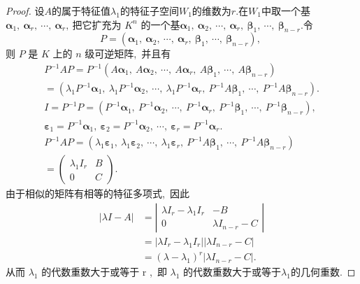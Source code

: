 \begin{proof}
	设$A$的属于特征值$\lambda_1$的特征子空间$W_1$的维数为$r.$在$W_1$中取一个基$\boldsymbol{\alpha}_1,\ \boldsymbol{\alpha}_r,\ \cdots,\  \boldsymbol{\alpha}_{r} ,\  $把它扩充为 $ K^{n} $ 的一个基$  \boldsymbol{\alpha}_{1},\  \boldsymbol{\alpha}_{2},\  \cdots,\  \boldsymbol{\alpha}_{r},\  \boldsymbol{\beta}_{1},\  \cdots,\  \boldsymbol{\beta}_{n-r} .$令
	$$P=\left(\boldsymbol{\alpha}_{1},\  \boldsymbol{\alpha}_{2},\  \cdots,\  \boldsymbol{\alpha}_{r},\  \boldsymbol{\beta}_{1},\  \cdots,\  \boldsymbol{\beta}_{n-r}\right),\ $$
	则 $ P$  是  $K$  上的  $n$  级可逆矩阵,\ 并且有
	$$\begin{array}{l} 
		P^{-1} A P= P^{-1}\left(A \boldsymbol{\alpha}_{1},\  A \boldsymbol{\alpha}_{2},\  \cdots,\  A \boldsymbol{\alpha}_{r},\  A \boldsymbol{\beta}_{1},\  \cdots,\  A \boldsymbol{\beta}_{n-r}\right) \\
		=\left(\lambda_{1} P^{-1} \boldsymbol{\alpha}_{1},\  \lambda_{1} P^{-1} \boldsymbol{\alpha}_{2},\  \cdots,\  \lambda_{1} P^{-1} \boldsymbol{\alpha}_{r},\  P^{-1} A \boldsymbol{\beta}_{1},\  \cdots,\  P^{-1} A \boldsymbol{\beta}_{n-r}\right) . \\
		I=P^{-1} P=\left(P^{-1} \boldsymbol{\alpha}_{1},\  P^{-1} \boldsymbol{\alpha}_{2},\  \cdots,\  P^{-1} \boldsymbol{\alpha}_{r},\  P^{-1} \boldsymbol{\beta}_{1},\  \cdots,\  P^{-1} \boldsymbol{\beta}_{n-r}\right),\  \\
		\boldsymbol{\varepsilon}_{1}=P^{-1} \boldsymbol{\alpha}_{1},\  \boldsymbol{\varepsilon}_{2}=P^{-1} \boldsymbol{\alpha}_{2},\  \cdots,\  \boldsymbol{\varepsilon}_{r}=P^{-1} \boldsymbol{\alpha}_{r} . \\
		P^{-1} A P=\left(\lambda_{1} \boldsymbol{\varepsilon}_{1},\  \lambda_{1} \boldsymbol{\varepsilon}_{2},\  \cdots,\  \lambda_{1} \boldsymbol{\varepsilon}_{r},\  P^{-1} A \boldsymbol{\beta}_{1},\  \cdots,\  P^{-1} A \boldsymbol{\beta}_{n-r}\right) \\
		=\left(\begin{array}{cc}
			\lambda_{1} I_{r} & B \\
			0 & C
		\end{array}\right) .
	\end{array}$$
	由于相似的矩阵有相等的特征多项式,\  因此
	$$\begin{aligned}
		|\lambda I-A| & =\left|\begin{array}{cc}
			\lambda I_{r}-\lambda_{1} I_{r} & -B \\
			0 & \lambda I_{n-r}-C
		\end{array}\right| \\
		& =\left|\lambda I_{r}-\lambda_{1} I_{r}\right|\left|\lambda I_{n-r}-C\right| \\
		& =\left(\lambda-\lambda_{1}\right)^{r}\left|\lambda I_{n-r}-C\right| .
	\end{aligned}$$
	从而 $ \lambda_{1} $ 的代数重数大于或等于  r ,\  即 $ \lambda_{1} $ 的代数重数大于或等于$  \lambda_{1}  $的几何重数.
\end{proof}
